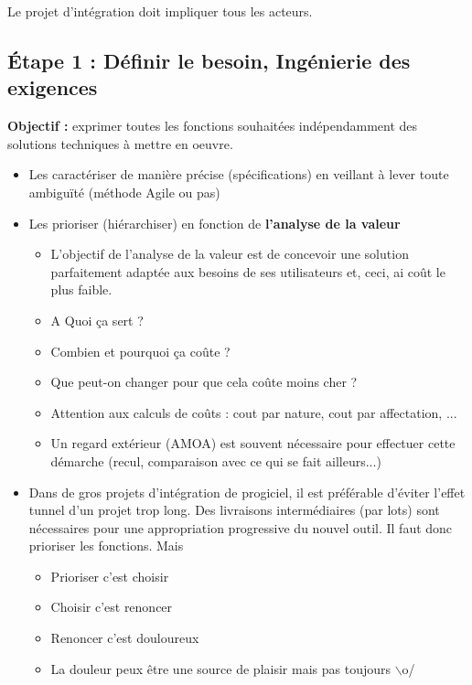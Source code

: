 \documentclass[11pt,a4paper]{article}
\begin{document}
	Le projet d'intégration doit impliquer tous les acteurs.
	
	\subsection{Étape 1 : Définir le besoin, Ingénierie des exigences}
	
	\textbf{Objectif :} exprimer toutes les fonctions souhaitées indépendamment des solutions techniques à mettre en oeuvre.
	\begin{itemize}
		\item Les caractériser de manière précise (spécifications) en veillant à lever toute ambiguïté (méthode Agile ou pas)
		\item Les prioriser (hiérarchiser) en fonction de \textbf{l'analyse de la valeur}
		\begin{itemize}
			\item L'objectif de l'analyse de la valeur est de concevoir une solution parfaitement adaptée aux besoins de ses utilisateurs et, ceci, ai coût le plus faible.
			\item A Quoi ça sert ?
			\item Combien et pourquoi ça coûte ?
			\item Que peut-on changer pour que cela coûte moins cher ?
			\item Attention aux calculs de coûts : cout par nature, cout par affectation, ...
			\item Un regard extérieur (AMOA) est souvent nécessaire pour effectuer cette démarche (recul, comparaison avec ce qui se fait ailleurs...)
		\end{itemize}
		\item Dans de gros projets d'intégration de progiciel, il est préférable d'éviter l'effet tunnel d'un projet trop long. Des livraisons intermédiaires (par lots) sont nécessaires pour une appropriation progressive du nouvel outil. Il faut donc prioriser les fonctions. Mais
		\begin{itemize}
			\item Prioriser c'est choisir
			\item Choisir c'est renoncer
			\item Renoncer c'est douloureux
			\item La douleur peux être une source de plaisir mais pas toujours $\backslash$o/
		\end{itemize}
	\end{itemize}

	\newpage
	
\end{document}
